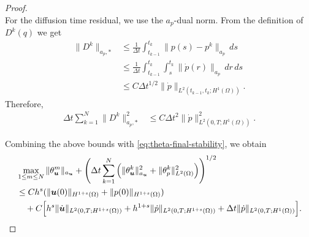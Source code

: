 \documentclass{amsart}
\begin{document}
\begin{proof}
\[\]
%
For the diffusion time residual, we use the $a_p$-dual norm. From the definition of $D^k(q)$ we get
\[
\begin{aligned}
\|D^k\|_{a_p,*}
&\le
\frac1{\Delta t}
\int_{t_{k-1}}^{t_k}
\|p(s)-p^k\|_{a_p}\,ds
\\
&\le
\frac1{\Delta t}
\int_{t_{k-1}}^{t_k}
\int_s^{t_k}
\|\dot p(r)\|_{a_p}\,dr\,ds
\\
&\le
C\Delta t^{1/2}
\|\dot p\|_{L^2(t_{k-1},t_k;H^1(\Omega))}.
\end{aligned}
\]
Therefore,
\[
\begin{aligned}
\Delta t\sum_{k=1}^N
\|D^k\|_{a_p,*}^2
&\le
C\Delta t^2
\|\dot p\|_{L^2(0,T;H^1(\Omega))}^2 .
\end{aligned}
\]

Combining the above bounds with \eqref{eq:theta-final-stability}, we obtain
\begin{align}
\label{eq:theta-est-final}
&\max_{1\le m\le N}
\|\theta_{\boldsymbol u}^m\|_{a_{\boldsymbol u}} +\left(
\Delta t\sum_{k=1}^N
\left(
\|\theta_{\boldsymbol u}^k\|_{a_{\boldsymbol u}}^2
+
\|\theta_p^k\|_{L^2(\Omega)}^2
\right)
\right)^{1/2} 
\\
\notag
&\le  Ch^{s} (\|\boldsymbol{u}(0)\|_{H^{1+s}(\Omega)} + \|p(0)\|_{H^{1+{s}}(\Omega)} )
\\
\nonumber
&\quad  +C\Big[
h^s
\|\dot{\boldsymbol u}\|_{L^2(0,T;H^{1+s}(\Omega))}
+
h^{1+s}
\|\dot p\|_{L^2(0,T;H^{1+s}(\Omega))}
+
\Delta t
\|\dot p\|_{L^2(0,T;H^1(\Omega))}
\Big].
\end{align}



\end{proof}
\end{document}
